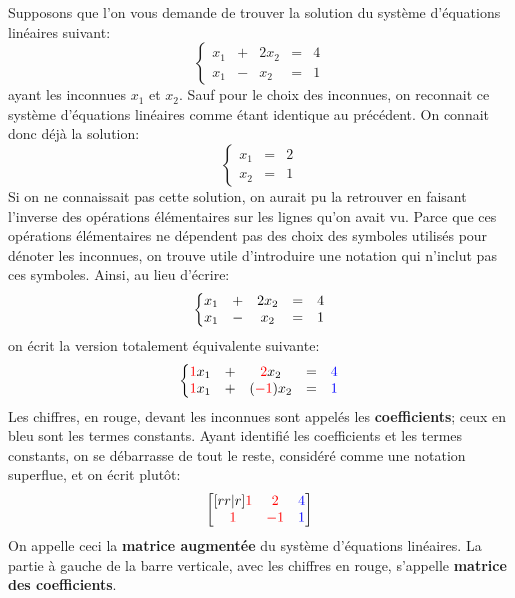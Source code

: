 Supposons que l'on vous demande de trouver la
solution du système d'équations linéaires suivant:
\[
\left\{
\begin{matrix}
    x_1&+&2x_2&=& 4	\\	
    x_1&-&x_2 &=& 1
\end{matrix}
\right.
\]
ayant les inconnues $x_1$ et $x_2$.  Sauf pour le choix
des inconnues, on reconnait ce système d'équations linéaires
comme étant identique au précédent. On connait donc déjà la
solution:
\[
\left\{
\begin{matrix}
x_1 &=& 2\\
x_2 &=& 1
\end{matrix}
\right.
\]
Si on ne connaissait pas cette solution, on aurait pu la
retrouver en faisant l'inverse des opérations élémentaires
sur les lignes qu'on avait vu.
Parce que ces opérations élémentaires ne dépendent pas des
choix des symboles utilisés pour dénoter les inconnues,
on trouve utile d'introduire une notation qui n'inclut pas
ces symboles. Ainsi, au lieu d'écrire:
\[
\left\{
\begin{matrix}
    x_1&+& 2x_2&=& 4	\\	
    x_1&-&x_2 &=& 1
\end{matrix}
\right.
\color{black}
\]
on écrit la version totalement équivalente suivante:
\[
\left\{
\begin{matrix}
    {\color{red}1}x_1&+& {\color{red}2}x_2&=& {\color{blue}4}	\\	
    {\color{red}1}x_1&+&({\color{red}-1})x_2 &=& {\color{blue}1}
\end{matrix}
\right.
\color{black}
\]
Les chiffres, en rouge, devant les inconnues sont appelés
les \textbf{coefficients}; ceux en bleu sont les termes constants.
Ayant identifié les coefficients et les termes constants,
on se débarrasse de tout le reste, considéré comme une notation
superflue, et on écrit plutôt:
\[
\begin{bmatrix}[rr|r]
{\color{red}1} & {\color{red}2} & {\color{blue}4}\\
{\color{red}1} & {\color{red}-1} & {\color{blue}1}
\end{bmatrix}
\]
On appelle ceci la \textbf{matrice augmentée} du système
d'équations linéaires. La partie à gauche de la barre verticale, 
avec les chiffres en rouge, s'appelle \textbf{matrice des coefficients}. 

